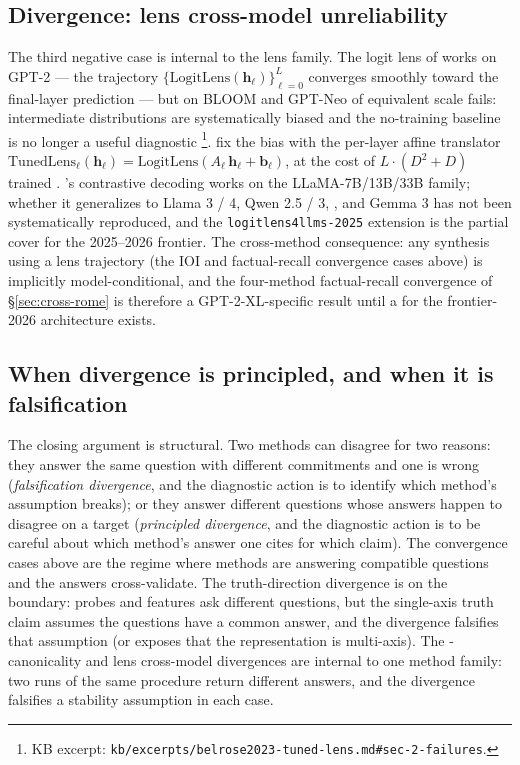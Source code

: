 \subsection{Divergence: lens cross-model unreliability}
\label{sec:cross-lens}

The third negative case is internal to the lens family. The logit
lens of \citet{nostalgebraist2020-logit-lens} works on GPT-2 ---
the trajectory $\{\mathrm{LogitLens}(\mathbf{h}_\ell)\}_{\ell=0}^L$
converges smoothly toward the final-layer prediction --- but on
BLOOM and GPT-Neo of equivalent scale fails: intermediate
distributions are systematically biased and the no-training
baseline is no longer a useful diagnostic
\citep[\S 2.2]{belrose2023-tuned-lens}\footnote{KB excerpt:
\texttt{kb/excerpts/belrose2023-tuned-lens.md\#sec-2-failures}.}.
\citet{belrose2023-tuned-lens} fix the bias with the per-layer
affine translator
$\mathrm{TunedLens}_\ell(\mathbf{h}_\ell) = \mathrm{LogitLens}(A_\ell\,
\mathbf{h}_\ell + \mathbf{b}_\ell)$, at the cost of
$L\!\cdot\!(D^2 + D)$ trained .
\citet{chuang2023-dola}'s  contrastive decoding works on the
LLaMA-7B/13B/33B family; whether it generalizes to Llama 3 / 4,
Qwen 2.5 / 3, , and Gemma 3 has not been systematically
reproduced, and the \texttt{logitlens4llms-2025} extension is the
partial cover for the 2025--2026 frontier. The cross-method
consequence: any synthesis using a lens trajectory (the IOI and
factual-recall convergence cases above) is implicitly
model-conditional, and the four-method factual-recall convergence
of \S\ref{sec:cross-rome} is therefore a GPT-2-XL-specific result
until a  for the frontier-2026 architecture exists.

\subsection{When divergence is principled, and when it is falsification}
\label{sec:cross-principle}

The closing argument is structural. Two methods can disagree for
two reasons: they answer the same question with different
commitments and one is wrong (\emph{falsification divergence}, and
the diagnostic action is to identify which method's assumption
breaks); or they answer different questions whose answers happen
to disagree on a target (\emph{principled divergence}, and the
diagnostic action is to be careful about which method's answer one
cites for which claim). The convergence cases above are the regime
where methods are answering compatible questions and the answers
cross-validate. The truth-direction divergence is on the boundary:
probes and  features ask different questions, but the
single-axis truth claim assumes the questions have a common answer,
and the divergence falsifies that assumption (or exposes that the
representation is multi-axis). The -canonicality and lens
cross-model divergences are internal to one method family: two
runs of the same procedure return different answers, and the
divergence falsifies a stability assumption in each case.

